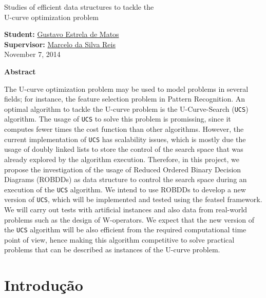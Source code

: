 \documentclass[12pt]{article}
\begin{document}
\begin{center}

  {\LARGE Studies of efficient data structures to tackle the\\
    \bigskip
    U-curve optimization problem}

  \bigskip
        
  {\large {\bf Student:} \href{mailto:gustavo.estrela.matos@usp.br}{Gustavo Estrela de Matos}\\ 
  {\bf Supervisor:} \href{mailto:marcelo.reis@butantan.gov.br}{Marcelo da Silva Reis}\\
  \bigskip
  November 7, 2014\\
  }

  \bigskip
  \bigskip

  {\bf Abstract}

\end{center}
The U-curve optimization problem may be used to model problems in several fields; for instance, the feature selection problem in Pattern Recognition. An optimal algorithm to tackle the U-curve problem is the U-Curve-Search ({\tt UCS}) algorithm. The usage of {\tt UCS} to solve this problem is promissing, since it computes fewer times the cost function than other algorithms. However, the current implementation of {\tt UCS} has scalability issues, which is mostly due the usage of doubly linked lists to store the control of the search space that was already explored by the algorithm execution. Therefore, in this project, we propose the investigation of the usage of Reduced Ordered Binary Decision Diagrams (ROBDDs) as data structure to control the search space during an execution of the {\tt UCS} algorithm. We intend to use ROBDDs to develop a new version of {\tt UCS}, which will be implemented and tested using the featsel framework. We will carry out tests with artificial instances and also data from real-world problems such as the design of W-operators. We expect that the new version of the {\tt UCS} algorithm will be also efficient from the required computational time point of view, hence making this algorithm competitive to solve practical problems that can be described as instances of the U-curve problem.

\newpage

\tableofcontents 

\newpage

\section{Introdução}
\end{document}
